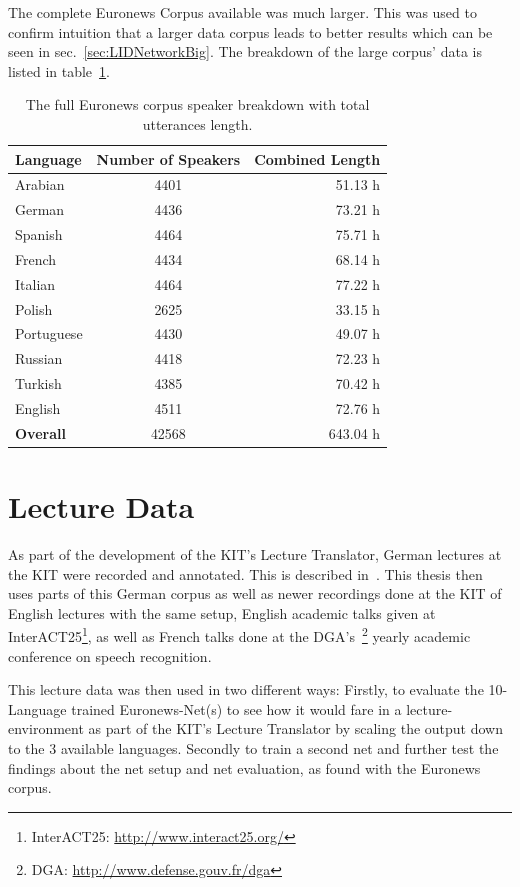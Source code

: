 The complete Euronews Corpus available was much larger. This was used to confirm intuition that a larger data corpus leads to better results which can be seen in sec.~\ref{sec:LIDNetworkBig}. The breakdown of the large corpus' data is listed in table~\ref{tab:spkDataBig}.

\begin{table}[h!]
\caption{The full Euronews corpus speaker breakdown with total utterances length.}
\label{tab:spkDataBig}
\centering
\begin{tabular}{| l | c | r | }
	\hline
	\textbf{Language} & \textbf{Number of Speakers} & \textbf{Combined Length} \\
	\hline
	Arabian & 4401 & 51.13 h \\
	German & 4436 & 73.21 h \\
	Spanish & 4464 & 75.71 h \\
	French & 4434 & 68.14 h \\  
	Italian & 4464 & 77.22 h \\  
	Polish & 2625 & 33.15 h \\ 
	Portuguese & 4430 & 49.07 h \\ 
	Russian & 4418 & 72.23 h \\ 
	Turkish & 4385 & 70.42 h \\  
	English & 4511 & 72.76 h \\ 
	\hline
	\textbf{Overall} & 42568 & 643.04 h\\
	\hline	
\end{tabular}
\end{table}

\newpage
\section{Lecture Data}
\label{sec:LITasks:Lecture}

As part of the development of the KIT's Lecture Translator, German lectures at the KIT were recorded and annotated. This is described in~\cite{stuker2012kit}. This thesis then uses parts of this German corpus as well as newer recordings done at the KIT of English lectures with the same setup, English academic talks given at InterACT25\footnote{InterACT25: \url{http://www.interact25.org/}}, as well as French talks done at the DGA's~\footnote{DGA: \url{http://www.defense.gouv.fr/dga}} yearly academic conference on speech recognition.

This lecture data was then used in two different ways: Firstly, to evaluate the 10-Language trained Euronews-Net(s) to see how it would fare in a lecture-environment as part of the KIT's Lecture Translator by scaling the output down to the 3 available languages. Secondly to train a second net and further test the findings about the net setup and net evaluation, as found with the Euronews corpus.

